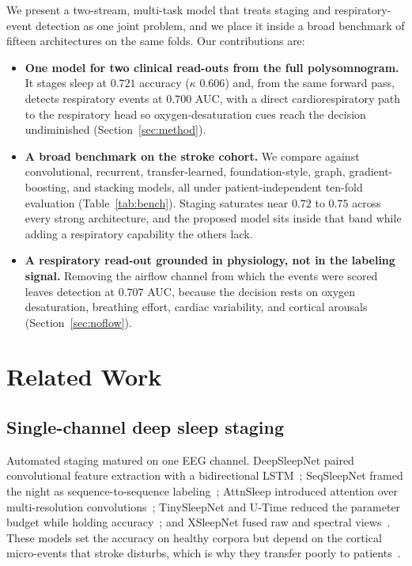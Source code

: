 \documentclass[journal]{IEEEtran}
\newcommand{\mmAcc}{0.721}
\newcommand{\mmK}{0.606}
\newcommand{\mmAuc}{0.700}
\newcommand{\noflowAuc}{0.707}
\begin{document}
We present a two-stream, multi-task model that treats staging and respiratory-event
detection as one joint problem, and we place it inside a broad benchmark of fifteen
architectures on the same folds. Our contributions are:

\begin{itemize}
\item \textbf{One model for two clinical read-outs from the full polysomnogram.} It stages
sleep at $\mmAcc$ accuracy ($\kappa$ $\mmK$) and, from the same forward pass, detects
respiratory events at $\mmAuc$ AUC, with a direct cardiorespiratory path to the respiratory
head so oxygen-desaturation cues reach the decision undiminished (Section~\ref{sec:method}).
\item \textbf{A broad benchmark on the stroke cohort.} We compare against convolutional,
recurrent, transfer-learned, foundation-style, graph, gradient-boosting, and stacking models,
all under patient-independent ten-fold evaluation (Table~\ref{tab:bench}). Staging saturates
near $0.72$ to $0.75$ across every strong architecture, and the proposed model sits inside
that band while adding a respiratory capability the others lack.
\item \textbf{A respiratory read-out grounded in physiology, not in the labeling signal.}
Removing the airflow channel from which the events were scored leaves detection at
$\noflowAuc$ AUC, because the decision rests on oxygen desaturation, breathing effort,
cardiac variability, and cortical arousals (Section~\ref{sec:noflow}).
\end{itemize}

\section{Related Work}
\label{sec:related}

\subsection{Single-channel deep sleep staging}
Automated staging matured on one EEG channel. DeepSleepNet paired convolutional feature
extraction with a bidirectional LSTM~\cite{supratak2017deepsleepnet}; SeqSleepNet framed the
night as sequence-to-sequence labeling~\cite{phan2019seqsleepnet}; AttnSleep introduced
attention over multi-resolution convolutions~\cite{eldele2021attnsleep}; TinySleepNet and
U-Time reduced the parameter budget while holding
accuracy~\cite{supratak2020tinysleepnet,perslev2019utime}; and XSleepNet fused raw and
spectral views~\cite{phan2021xsleepnet}. These models set the accuracy on healthy corpora but
depend on the cortical micro-events that stroke disturbs, which is why they transfer poorly to
patients~\cite{bose2026gap}.
\end{document}
